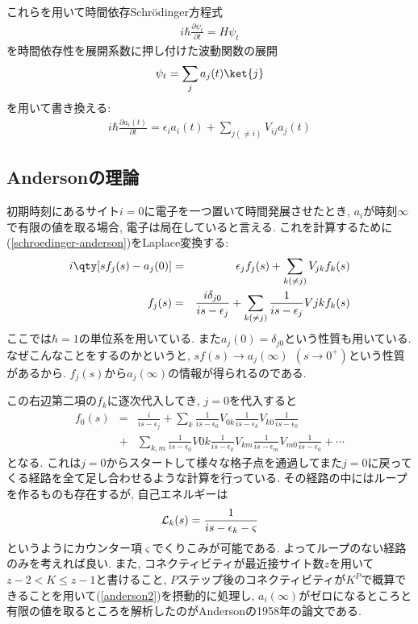 \documentclass[10.5pt,a4paper]{jreport}
\begin{document}
これらを用いて時間依存Schr\"odinger方程式
\begin{eqnarray}
  i\hbar\frac{\partial \psi_t}{\partial t} = H\psi_t
\end{eqnarray}
を時間依存性を展開系数に押し付けた波動関数の展開
\begin{eqnarray}
  \psi_t = \sum_j a_j(t)\ket{j}
\end{eqnarray}
を用いて書き換える:
\begin{eqnarray}
  i\hbar\frac{\partial a_i(t)}{\partial t} = \epsilon_ia_i(t) + \sum_{j(\neq i)}V_{ij}a_j(t)\label{schroedinger-anderson}
\end{eqnarray}
\subsection{Andersonの理論}
初期時刻にあるサイト$i=0$に電子を一つ置いて時間発展させたとき, $a_i$が時刻$\infty$で有限の値を取る場合, 電子は局在していると言える. これを計算するために(\ref{schroedinger-anderson})をLaplace変換する:
\begin{eqnarray}
  i\qty[sf_j(s) - a_j(0)] &=& \epsilon_jf_j(s) + \sum_{k(\neq j)}V_{jk}f_k(s)\\
  f_j(s) &=& \frac{i\delta_{j0}}{is - \epsilon_j} + \sum_{k(\neq j)}\frac{1}{is - \epsilon_j}V{jk}f_k(s)
\end{eqnarray}
ここでは$\hbar = 1$の単位系を用いている. また$a_j(0) = \delta_{j0}$という性質も用いている. なぜこんなことをするのかというと, $sf(s)\rightarrow a_j(\infty)\ \ (s\rightarrow 0^+)$という性質があるから. $f_j(s)$から$a_j(\infty)$の情報が得られるのである.

この右辺第二項の$f_k$に逐次代入してき, $j = 0$を代入すると
\begin{eqnarray}
  \nonumber  f_0(s) &=&  \frac{i}{is - \epsilon_j} + \sum_k\frac{1}{is - \epsilon_0}V_{0k}\frac{1}{is - \epsilon_k}V_{k0}\frac{1}{is - \epsilon_0}\\
  &+& \sum_{k, m} \frac{1}{is - \epsilon_0}V{0k}\frac{1}{is - \epsilon_k}V_{km}\frac{1}{is - \epsilon_m}V_{m0}\frac{1}{is - \epsilon_0} + \cdots \label{anderson2}
\end{eqnarray}
となる. これは$j = 0$からスタートして様々な格子点を通過してまた$j = 0$に戻ってくる経路を全て足し合わせるような計算を行っている. その経路の中にはループを作るものも存在するが, 自己エネルギーは
\begin{eqnarray}
  {\cal L}_k(s) = \frac{1}{is - \epsilon_k - \varsigma}
\end{eqnarray}
というようにカウンター項$\varsigma$でくりこみが可能である. よってループのない経路のみを考えれば良い. また, コネクティビティが最近接サイト数$z$を用いて$z-2 < K \leq z - 1$と書けること, $P$ステップ後のコネクティビティが$K^P$で概算できることを用いて(\ref{anderson2})を摂動的に処理し, $a_i(\infty)$がゼロになるところと有限の値を取るところを解析したのがAndersonの1958年の論文である.
\end{document}
